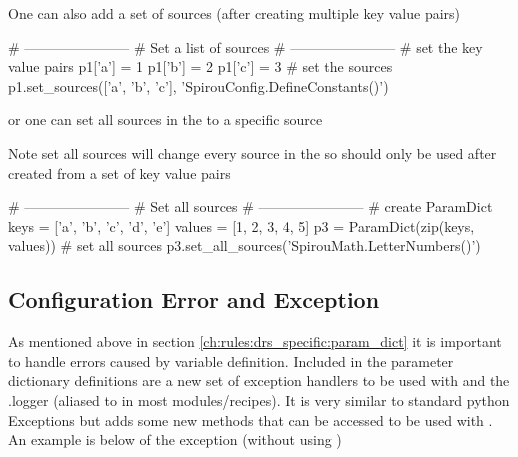 \newpage

\noindent One can also add a set of sources (after creating multiple key value pairs)
\begin{pythonbox}
# -----------------------
# Set a list of sources
# -----------------------
# set the key value pairs
p1['a'] = 1
p1['b'] = 2
p1['c'] = 3
# set the sources
p1.set_sources(['a', 'b', 'c'], 'SpirouConfig.DefineConstants()')
\end{pythonbox}

\vspace{0.5cm}
\noindent or one can set all sources in the \ParamDict to a specific source
\begin{note}
Note set all sources will change every source in the \ParamDict so should only be used after \ParamDict created from a set of key value pairs
\end{note}

\begin{pythonbox}
# -----------------------
# Set all sources
# -----------------------
# create ParamDict
keys = ['a', 'b', 'c', 'd', 'e']
values = [1, 2, 3, 4, 5]
p3 = ParamDict(zip(keys, values))
# set all sources
p3.set_all_sources('SpirouMath.LetterNumbers()')
\end{pythonbox}


\clearpage
\newpage
\subsection{Configuration Error and Exception}
\label{ch:rules:drs_specific:config_error}

As mentioned above in section \ref{ch:rules:drs_specific:param_dict} it is important to handle errors caused by variable definition. Included in the parameter dictionary definitions are a new set of exception handlers to be used with \ParamDict and the \spirouLog.logger (aliased to \WLOG in most modules/recipes). It is very similar to standard python Exceptions but adds some new methods that can be accessed to be used with \WLOG. \\

An example is below of the \ConfigError exception (without using \ParamDict)

